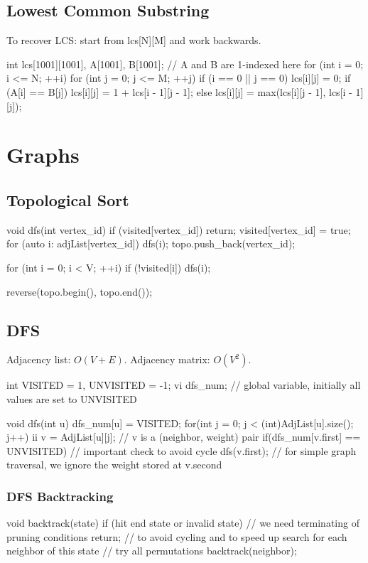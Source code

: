 \documentclass{article}
\begin{document}
\subsection{Lowest Common Substring}
To recover LCS: start from lcs[N][M] and work backwards.
\begin{mylisting}{}
int lcs[1001][1001], A[1001], B[1001]; // A and B are 1-indexed here
for (int i = 0; i <= N; ++i) {
	for (int j = 0; j <= M; ++j) {
		if (i == 0 || j == 0) lcs[i][j] = 0;
		if (A[i] == B[j]) lcs[i][j] = 1 + lcs[i - 1][j - 1];
		else lcs[i][j] = max(lcs[i][j - 1], lcs[i - 1][j]);
	}
}
\end{mylisting}


\section{Graphs}
\subsection{Topological Sort}
\begin{mylisting}{}
void dfs(int vertex_id) {
	if (visited[vertex_id]) return;
	visited[vertex_id] = true;
	for (auto i: adjList[vertex_id]) {
		dfs(i);
	}
	topo.push_back(vertex_id);
}

for (int i = 0; i < V; ++i)
	if (!visited[i]) dfs(i);
	
reverse(topo.begin(), topo.end());
\end{mylisting}

\subsection{DFS}
Adjacency list: \(O(V + E)\). Adjacency matrix: \(O(V^2)\).
\begin{mylisting}{}
int VISITED = 1, UNVISITED = -1;
vi dfs_num;	// global variable, initially all values are set to UNVISITED

void dfs(int u){
	dfs_num[u] = VISITED;
	for(int j = 0; j < (int)AdjList[u].size(); j++){
			ii v = AdjList[u][j];	// v is a (neighbor, weight) pair
			if(dfs_num[v.first] == UNVISITED)	// important check to avoid cycle
				dfs(v.first);
	}	// for simple graph traversal, we ignore the weight stored at v.second
}
\end{mylisting}

\subsubsection{DFS Backtracking}
\begin{mylisting}{}
void backtrack(state){
	if (hit end state or invalid state)	// we need terminating of pruning conditions
		return;	// to avoid cycling and to speed up search
	for each neighbor of this state	// try all permutations
		backtrack(neighbor);
}
\end{mylisting}
\end{document}
